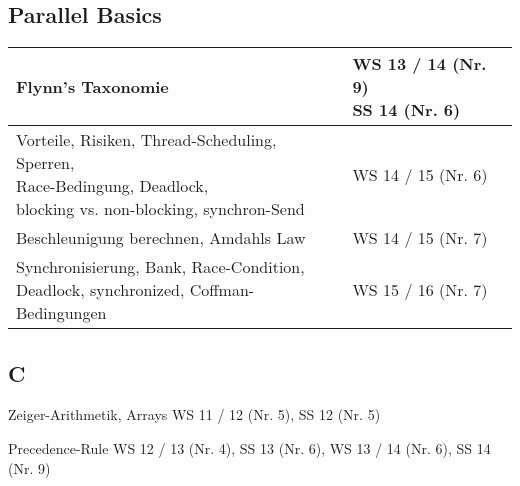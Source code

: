 \subsection*{Parallel Basics}
\begin{table}[h]
	\centering
	\begin{tabular}{l|l}		
		Flynn’s Taxonomie 
		& \multlineTable{WS 13 / 14 (Nr. 9)\\ SS 14 (Nr. 6)}\\ \hline		
		
		\multlineTable{Vorteile, Risiken, Thread-Scheduling, Sperren,\\ Race-Bedingung, Deadlock,\\ blocking vs. non-blocking, synchron-Send}
		& WS 14 / 15 (Nr. 6) \\ \hline			
		
		Beschleunigung berechnen, Amdahls Law
		& WS 14 / 15 (Nr. 7) \\ \hline		
				
		\multlineTable{Synchronisierung, Bank, Race-Condition,\\ Deadlock, synchronized, Coffman-Bedingungen}
		& WS 15 / 16 (Nr. 7) \\ \hline
	\end{tabular}
\end{table}
\FloatBarrier
\newpage

\subsection*{C}
\begin{compactitem}
	\item Zeiger-Arithmetik, Arrays \qquad WS 11 / 12 (Nr. 5),  SS 12 (Nr. 5)
	\item Precedence-Rule \qquad \qquad \qquad WS 12 / 13 (Nr. 4), SS 13 (Nr. 6), WS 13 / 14 (Nr. 6), SS 14 (Nr. 9)
\end{compactitem}

